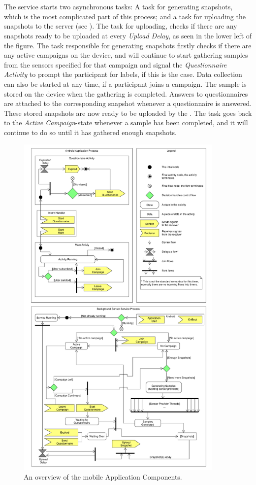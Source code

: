 \\\\
The service starts two asynchronous tasks: A task for generating snapshots, which is the most complicated part of this process; and a task for uploading the snapshots to the server (see ). The task for uploading, checks if there are any snapshots ready to be uploaded at every \emph{Upload Delay}, as seen in the lower left of the figure. The task responsible for generating snapshots firstly checks if there are any active campaigns on the device, and will continue to start gathering samples from the sensors specified for that campaign and signal the \emph{Questionnaire Activity} to prompt the participant for labels, if this is the case. Data collection can also be started at any time, if a participant joins a campaign. The sample is stored on the device when the gathering is completed. Answers to questionnaires are attached to the corresponding snapshot whenever a questionnaire is answered. These stored snapshots are now ready to be uploaded by the . The task goes back to the \emph{Active Campaign}-state whenever a sample has been completed, and it will continue to do so until it has gathered enough snapshots.

\begin{figure}[!htbp]
    \centering
    \includegraphics[width=0.9\textwidth]{graphic/backgroundsensorservice/lifecyclestuff}
    \caption{An overview of the mobile Application Components.}
    \label{fig:system_currency_and_lifecycle}
\end{figure}
\FloatBarrier